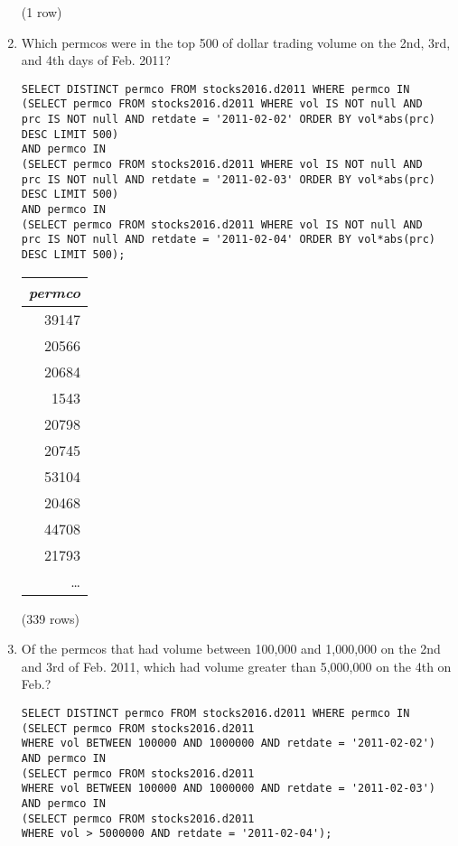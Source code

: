 \documentclass[]{article}
\newenvironment{question}[2][Question]{\begin{trivlist}
\item[\hskip \labelsep {\bfseries #1}\hskip \labelsep {\bfseries #2.}]}{\end{trivlist}}
\begin{document}
\begin{question}{1}
\begin{enumerate}[label=(\alph*)]
\begin{center}
\noindent (1 row) \\
\end{center}

\item Which permcos were in the top 500 of dollar trading volume on the 2nd, 3rd, and 4th days of Feb. 2011?
  \color{blue}
\begin{verbatim}
SELECT DISTINCT permco FROM stocks2016.d2011 WHERE permco IN
(SELECT permco FROM stocks2016.d2011 WHERE vol IS NOT null AND
prc IS NOT null AND retdate = '2011-02-02' ORDER BY vol*abs(prc) DESC LIMIT 500)
AND permco IN
(SELECT permco FROM stocks2016.d2011 WHERE vol IS NOT null AND
prc IS NOT null AND retdate = '2011-02-03' ORDER BY vol*abs(prc) DESC LIMIT 500)
AND permco IN
(SELECT permco FROM stocks2016.d2011 WHERE vol IS NOT null AND
prc IS NOT null AND retdate = '2011-02-04' ORDER BY vol*abs(prc) DESC LIMIT 500);
  \end{verbatim}
\color{black}

\begin{center}
\begin{tabular}{r}
\textit{permco} \\
\hline
39147 \\
20566 \\
20684 \\
1543 \\
20798 \\
20745 \\
53104 \\
20468 \\
44708 \\
21793 \\
\ldots \\
\end{tabular}

\noindent (339 rows) \\
\end{center}

\item Of the permcos that had volume between 100,000 and 1,000,000 on the 2nd and 3rd of Feb. 2011, which had volume greater than 5,000,000 on the 4th on Feb.?
  \color{blue}
\begin{verbatim}
SELECT DISTINCT permco FROM stocks2016.d2011 WHERE permco IN
(SELECT permco FROM stocks2016.d2011
WHERE vol BETWEEN 100000 AND 1000000 AND retdate = '2011-02-02')
AND permco IN
(SELECT permco FROM stocks2016.d2011
WHERE vol BETWEEN 100000 AND 1000000 AND retdate = '2011-02-03')
AND permco IN
(SELECT permco FROM stocks2016.d2011
WHERE vol > 5000000 AND retdate = '2011-02-04');
  \end{verbatim}
\color{black}


\end{enumerate}
\end{question}
\end{document}
